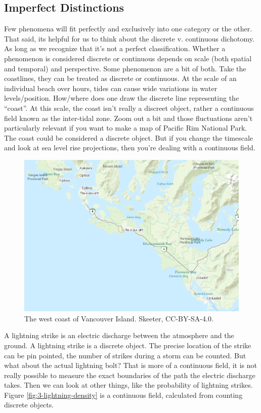 \documentclass[
]{book}
\begin{document}
\subsection{Imperfect Distinctions}\label{imperfect-distinctions}

Few phenomena will fit perfectly and exclusively into one category or the other. That said, its helpful for us to think about the discrete v. continuous dichotomy. As long as we recognize that it's not a perfect classification. Whether a phenomenon is considered discrete or continuous depends on scale (both spatial and temporal) and perspective. Some phenomenon are a bit of both. Take the coastlines, they can be treated as discrete or continuous. At the scale of an individual beach over hours, tides can cause wide variations in water levels/position. How/where does one draw the discrete line representing the ``coast''. At this scale, the coast isn't really a discreet object, rather a continuous field known as the inter-tidal zone. Zoom out a bit and those fluctuations aren't particularly relevant if you want to make a map of Pacific Rim National Park. The coast could be considered a discrete object. But if you change the timescale and look at sea level rise projections, then you're dealing with a continuous field.

\begin{figure}
\includegraphics[width=0.75\linewidth]{images/03-beach-small-scale} \caption{The west coast of Vancouver Island. Skeeter, CC-BY-SA-4.0.}\label{fig:3-beach-small-scale}
\end{figure}

A lightning strike is an electric discharge between the atmosphere and the ground. A lightning strike is a discrete object. The precise location of the strike can be pin pointed, the number of strikes during a storm can be counted. But what about the actual lightning bolt? That is more of a continuous field, it is not really possible to measure the exact boundaries of the path the electric discharge takes. Then we can look at other things, like the probability of lightning strikes. Figure \ref{fig:3-lightning-density} is a continuous field, calculated from counting discrete objects.
\end{document}
